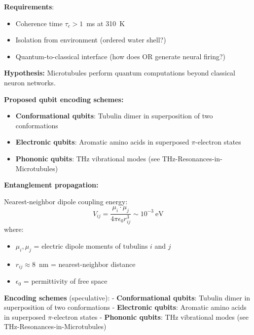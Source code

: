 \textbf{Requirements}:
\begin{itemize}
\item Coherence time \(\tau_c > 1\)~ms at 310~K
\item Isolation from environment (ordered water shell?)
\item Quantum-to-classical interface (how does OR generate neural firing?)
\end{itemize}


\textbf{Hypothesis:} Microtubules perform quantum computations beyond classical neuron networks.

\textbf{Proposed qubit encoding schemes:}
\begin{itemize}
\item \textbf{Conformational qubits}: Tubulin dimer in superposition of two conformations
\item \textbf{Electronic qubits}: Aromatic amino acids in superposed $\pi$-electron states
\item \textbf{Phononic qubits}: THz vibrational modes (see THz-Resonances-in-Microtubules)
\end{itemize}

\textbf{Entanglement propagation:}

Nearest-neighbor dipole coupling energy:
\begin{equation}
V_{ij} = \frac{\mu_i \cdot \mu_j}{4\pi\epsilon_0 r_{ij}^3} \sim 10^{-3}\ \mathrm{eV}
\end{equation}
where:
\begin{itemize}
\item $\mu_i, \mu_j$ = electric dipole moments of tubulins $i$ and $j$
\item $r_{ij} \approx 8$~nm = nearest-neighbor distance
\item $\epsilon_0$ = permittivity of free space
\end{itemize}

\textbf{Encoding schemes} (speculative): - \textbf{Conformational
qubits}: Tubulin dimer in superposition of two conformations -
\textbf{Electronic qubits}: Aromatic amino acids in superposed
\(\pi\)-electron states - \textbf{Phononic qubits}: THz vibrational
modes (see THz-Resonances-in-Microtubules)

